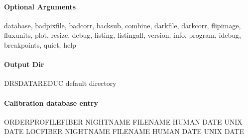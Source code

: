 \documentclass[a4paper,10pt,english]{report}
\begin{document}
\paragraph{Optional Arguments}
\label{\detokenize{user/spirou/recipes/localisation:optional-arguments}}
\begin{sphinxVerbatim}[commandchars=\\\{\}]
\PYGZhy{}\PYGZhy{}database, \PYGZhy{}\PYGZhy{}badpixfile, \PYGZhy{}\PYGZhy{}badcorr, \PYGZhy{}\PYGZhy{}backsub, \PYGZhy{}\PYGZhy{}combine,
\PYGZhy{}\PYGZhy{}darkfile, \PYGZhy{}\PYGZhy{}darkcorr,  \PYGZhy{}\PYGZhy{}flipimage, \PYGZhy{}\PYGZhy{}fluxunits, \PYGZhy{}\PYGZhy{}plot, \PYGZhy{}\PYGZhy{}resize,
\PYGZhy{}\PYGZhy{}debug, \PYGZhy{}\PYGZhy{}listing, \PYGZhy{}\PYGZhy{}listingall, \PYGZhy{}\PYGZhy{}version, \PYGZhy{}\PYGZhy{}info,
\PYGZhy{}\PYGZhy{}program, \PYGZhy{}\PYGZhy{}idebug, \PYGZhy{}\PYGZhy{}breakpoints, \PYGZhy{}\PYGZhy{}quiet, \PYGZhy{}\PYGZhy{}help
\end{sphinxVerbatim}


\paragraph{Output Dir}
\label{\detokenize{user/spirou/recipes/localisation:output-dir}}
\begin{sphinxVerbatim}[commandchars=\\\{\}]
DRS\PYGZus{}DATA\PYGZus{}REDUC    default  directory
\end{sphinxVerbatim}


\paragraph{Calibration database entry}
\label{\detokenize{user/spirou/recipes/localisation:calibration-database-entry}}
\begin{sphinxVerbatim}[commandchars=\\\{\}]
ORDER\PYGZus{}PROFILE\PYGZus{}FIBER NIGHT\PYGZus{}NAME FILENAME HUMAN DATE UNIX DATE
LOC\PYGZus{}FIBER NIGHT\PYGZus{}NAME FILENAME HUMAN DATE UNIX DATE
\end{sphinxVerbatim}
\end{document}
